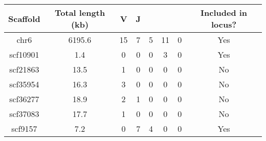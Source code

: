\begin{tabular}{cccccccc}\toprule
\textbf{Scaffold} & \textbf{Total length (kb)} & \textbf{V} & \textbf{J} & \textbf{\cm{}} & \textbf{\cd{}} & \textbf{\cz{}} & \textbf{Included in locus?}\\\midrule
chr6 & 6195.6 & 15 & 7 & 5 & 11 & 0 & Yes\\\midrule
scf10901 & 1.4 & 0 & 0 & 0 & 3 & 0 & Yes\\
scf21863 & 13.5 & 1 & 0 & 0 & 0 & 0 & No\\
scf35954 & 16.3 & 3 & 0 & 0 & 0 & 0 & No\\
scf36277 & 18.9 & 2 & 1 & 0 & 0 & 0 & No\\
scf37083 & 17.7 & 1 & 0 & 0 & 0 & 0 & No\\
scf9157 & 7.2 & 0 & 7 & 4 & 0 & 0 & Yes\\\bottomrule
\end{tabular}

